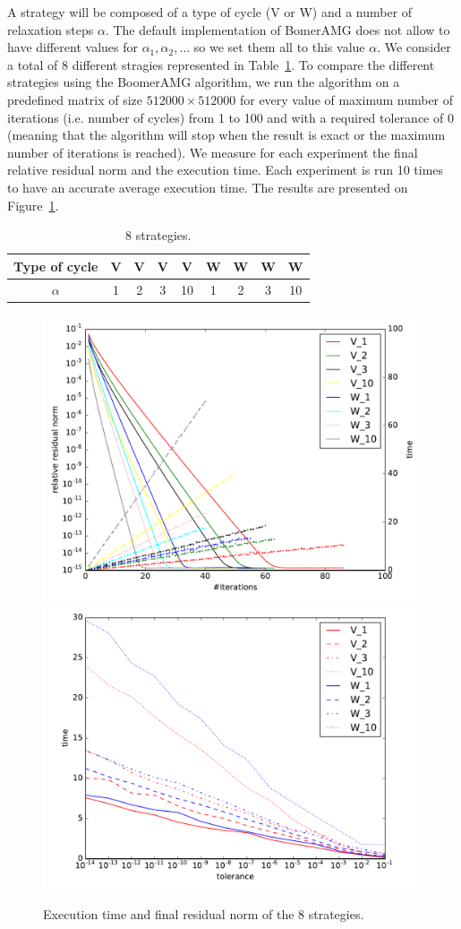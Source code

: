 \documentclass[a4paper,10pt]{article}
\begin{document}
A strategy will be composed of a type of cycle (V or W) and a number of relaxation steps $\alpha$. The default implementation of BomerAMG does not allow to have different values
for $\alpha_1,\alpha_2,\dots$ so we set them all to this value $\alpha$. We consider a total of 8 different stragies represented in Table~\ref{table.strat1}.
To compare the different strategies using the BoomerAMG algorithm, we run the algorithm on a predefined matrix of size $512000 \times 512000$ for every
value of maximum number of iterations (i.e. number of cycles) from 1 to 100 and with a required tolerance of $0$ (meaning
that the algorithm will stop when the result is exact or the maximum number of iterations is reached). We measure for each experiment the final relative residual norm and the execution time. Each experiment is run 10 times to have an accurate average execution time.
The results are presented on Figure~\ref{fig.first_tests}.

\begin{table}

\begin{center}
 \begin{tabular}{|c|c|c|c|c|c|c|c|c|}
   \hline
   Type of cycle & V & V & V & V & W & W & W & W \\
   \hline
   $\alpha$ & 1 & 2 & 3 & 10 & 1 & 2 & 3 & 10 \\
   \hline
 \end{tabular}
\end{center}
 \caption{8 strategies.}
 \label{table.strat1}

\end{table}


\begin{figure}
  \includegraphics[width=0.49\linewidth]{figs/convergence_1.pdf}
  \includegraphics[width=0.49\linewidth]{figs/time_convergence.pdf}
  \caption{Execution time and final residual norm of the 8 strategies.}
  \label{fig.first_tests}
\end{figure} 
\end{document}
